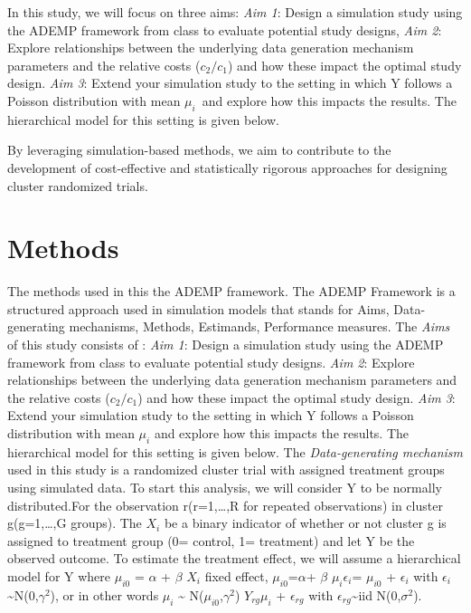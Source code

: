 \documentclass[
]{article}
\begin{document}
In this study, we will focus on three aims: \emph{Aim 1}: Design a
simulation study using the ADEMP framework from class to evaluate
potential study designs, \emph{Aim 2}: Explore relationships between the
underlying data generation mechanism parameters and the relative costs
(\(c_2 /c_1\)) and how these impact the optimal study design. \emph{Aim
3}: Extend your simulation study to the setting in which Y follows a
Poisson distribution with mean \(\mu_i\)~and explore how this impacts
the results. The hierarchical model for this setting is given below.

By leveraging simulation-based methods, we aim to contribute to the
development of cost-effective and statistically rigorous approaches for
designing cluster randomized trials.

\hypertarget{methods}{%
\section{Methods}\label{methods}}

The methods used in this the ADEMP framework. The ADEMP Framework is a
structured approach used in simulation models that stands for Aims,
Data-generating mechanisms, Methods, Estimands, Performance measures.
The \emph{Aims} of this study consists of : \emph{Aim 1}: Design a
simulation study using the ADEMP framework from class to evaluate
potential study designs. \emph{Aim 2}: Explore relationships between the
underlying data generation mechanism parameters and the relative costs
(\(c_2 /c_1\)) and how these impact the optimal study design. \emph{Aim
3}: Extend your simulation study to the setting in which Y follows a
Poisson distribution with mean \(\mu_i\) and explore how this impacts
the results. The hierarchical model for this setting is given below. The
\emph{Data-generating mechanism} used in this study is a randomized
cluster trial with assigned treatment groups using simulated data. To
start this analysis, we will consider Y to be normally distributed.For
the observation r(r=1,\ldots,R for repeated observations) in cluster
g(g=1,\ldots,G groups). The \(X_i\) be a binary indicator of whether or
not cluster g is assigned to treatment group (0= control, 1= treatment)
and let Y be the observed outcome. To estimate the treatment effect, we
will assume a hierarchical model for Y where \(\mu_{i0}\) = \(\alpha\) +
\(\beta\) \(X_i\) fixed effect, \(\mu_{i0}\)=\(\alpha\)+ \(\beta\)
\(\mu_{i}\)\textbar{}\(\epsilon_{i}\)= \(\mu_{i0}\) + \(\epsilon_{i}\)
with \(\epsilon_{i}\)\textasciitilde N(0,\(\gamma^2\)), or in other
words \(\mu_{i}\) \textasciitilde{} N(\(\mu_{i0}\),\(\gamma^2\))
\(Y_{rg}\)\textbar{}\(\mu_{i}\) + \(\epsilon_{rg}\) with
\(\epsilon_{rg}\)\textasciitilde iid N(0,\(\sigma^2\)).
\end{document}
